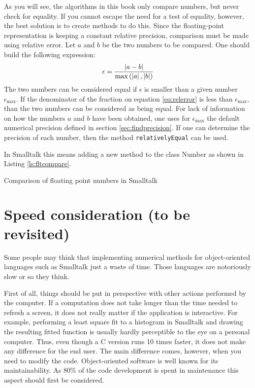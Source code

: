 \documentclass[twoside]{book}
\begin{document}
\noindent As you will see, the algorithms in this book only
compare numbers, but never check for equality. If you cannot
escape the need for a test of equality, however, the best solution
is to create methods to do this. Since the floating-point
representation is keeping a constant relative precision,
comparison must be made using relative error. Let $a$ and $b$ be
the two numbers to be compared. One should build the following
expression:
\begin{equation}
\label{eq:relerror}
\epsilon={\left|a-b\right| \over
\max\left(\left|a\right|,\left|b\right|\right)}
\end{equation}
The two numbers can be considered equal if $\epsilon$ is smaller
than a given number $\epsilon_{\max}$. If the denominator of the
fraction on equation \ref{eq:relerror} is less than
$\epsilon_{\max}$, than the two numbers can be considered as being
equal. For lack of information on how the numbers $a$ and $b$ have
been obtained, one uses for $\epsilon_{\max}$ the default
numerical precision defined in section \ref{sec:findprecision}. If
one can determine the precision of each number, then the method
{\tt relativelyEqual} can be used.

In Smalltalk this means adding a new method to the class Number as
shown in Listing \ref{ls:fltcompare}.

\begin{listing}
Comparison of floating point numbers in Smalltalk
\label{ls:fltcompare}

\end{listing}

\section{Speed consideration (to be revisited)}
\label{sec:speed} Some people may think that implementing
numerical methods for object-oriented languages such as Smalltalk just a waste
of time. Those languages are notoriously slow or so they think.

First of all, things should be put in perspective with other
actions performed by the computer. If a computation does not take
longer than the time needed to refresh a screen, it does not
really matter if the application is interactive. For example,
performing a least square fit to a histogram in Smalltalk and drawing the
resulting fitted function is usually hardly perceptible to the eye on a personal
computer. Thus, even though a C version runs 10 times faster, it
does not make any difference for the end user. The main difference
comes, however, when you need to modify the code. Object-oriented
software is well known for its maintainability. As $80\%$ of the
code development is spent in maintenance this aspect should first
be considered.
\end{document}

